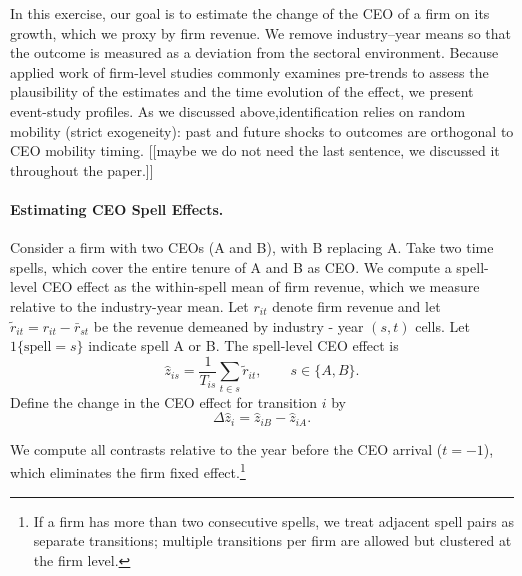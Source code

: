\documentclass[11pt,a4paper]{article}
\begin{document}
In this exercise, our goal is to estimate the change of the CEO of a firm on its growth, which we proxy by firm revenue. We remove industry–year means so that the outcome is measured as a deviation from the sectoral environment. Because applied work of firm-level studies commonly examines pre-trends to assess the plausibility of the estimates and the time evolution of the effect, we present event-study profiles. As we discussed above,identification relies on random mobility (strict exogeneity): past and future shocks to outcomes are orthogonal to CEO mobility timing. [[maybe we do not need the last sentence, we discussed it throughout the paper.]]

\paragraph{Estimating CEO Spell Effects.} Consider a firm with two CEOs (A and B), with B replacing A. Take two time spells, which cover the entire tenure of A and B as CEO. We compute a spell-level CEO effect as the within-spell mean of firm revenue, which we measure relative to the industry-year mean. Let \(r_{it}\) denote firm revenue and let \(\tilde r_{it}=r_{it}-\bar r_{st}\) be the revenue demeaned by industry - year \((s,t)\) cells. Let \(1\{\text{spell}=s\}\) indicate spell A or B. The spell-level CEO effect is
\begin{equation}
\hat z_{is} = \frac{1}{T_{is}}\sum_{t\in s} \tilde r_{it},\qquad s\in\{A,B\}.
\end{equation}
Define the change in the CEO effect for transition \(i\) by
\begin{equation}
\Delta \hat z_i = \hat z_{iB} - \hat z_{iA}.
\end{equation}

We compute all contrasts relative to the year before the CEO arrival ($t=-1$), which eliminates the firm fixed effect.\footnote{If a firm has more than two consecutive spells, we treat adjacent spell pairs as separate transitions; multiple transitions per firm are allowed but clustered at the firm level.}
\end{document}
